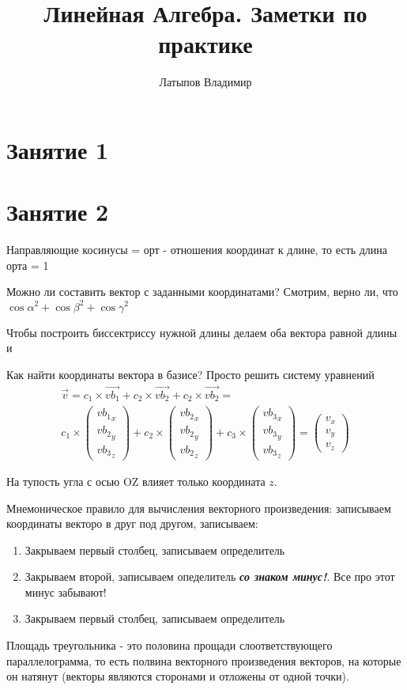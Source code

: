 \documentclass[12pt, a4paper]{article}
\title{Линейная Алгебра. Заметки по практике}
\author{Латыпов Владимир}
\begin{document}

    \section{Занятие 1}

    \section{Занятие 2}
    Направляющие косинусы = орт - отношения координат к длине, то есть длина орта = 1

    Можно ли составить вектор с заданными координатами? Смотрим, верно ли, что 
    $\cos{\alpha}^2 + \cos{\beta}^2 + \cos{\gamma}^2$

    Чтобы построить биссектриссу нужной длины делаем оба вектора равной длины и 


    Как найти координаты вектора в базисе? Просто решить систему уравнений 
    \begin{multline}
            \vec{v} = c_1 \times \vec{vb_1} + c_2 \times \vec{vb_2} + c_2 \times \vec{vb_2} = \\
            c_1 \times \begin{pmatrix}
                {vb_1}_{x}\\
                {vb_2}_{y} \\
                {vb_3}_{z}
        \end{pmatrix} + 
        c_2 \times \begin{pmatrix}
            {vb_2}_{x}\\
            {vb_2}_{y} \\
            {vb_2}_{z}
        \end{pmatrix}
        + c_3 \times \begin{pmatrix}
        {vb_3}_{x}\\
        {vb_3}_{y} \\
        {vb_3}_{z}
        \end{pmatrix} = \begin{pmatrix}
            {v}_{x}\\
            {v}_{y} \\
            {v}_{z}
            \end{pmatrix}
    \end{multline}

    На тупость угла с осью OZ влияет только координата $z$.

    Мнемоническое правило для вычисления векторного произведения: 
    записываем координаты векторо в друг под другом, записываем:
    \begin{enumerate}
        \item Закрываем первый столбец, записываем определитель
        \item Закрываем второй, записываем опеделитель \textit{\textbf{со знаком минус!}}. Все про этот минус забывают!
        \item Закрываем первый столбец, записываем определитель
    \end{enumerate}


    Площадь треугольника  - это половина прощади слоответствующего параллелограмма, то есть полвина векторного произведения векторов, на которые он натянут 
    (векторы являются сторонами и отложены от одной точки).

    
\end{document}
